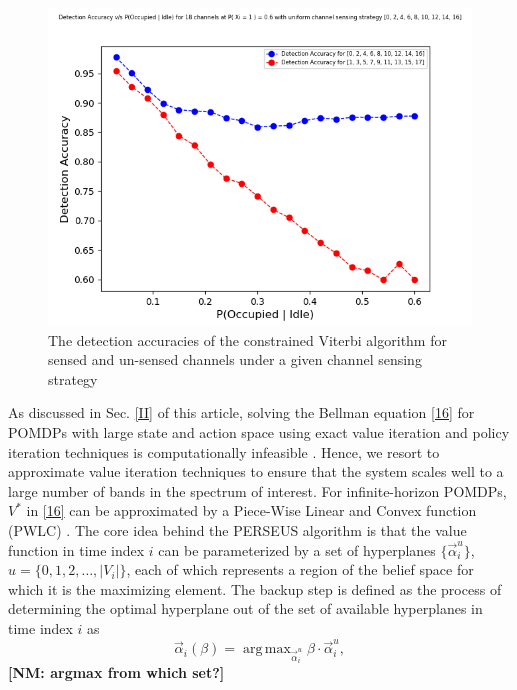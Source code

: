 \documentclass[10pt,twocolumn]{IEEEtran}
\newcommand{\nm}[1]{{\color{blue}\bf{[NM: #1]}}}
\DeclareMathOperator*{\argmax}{arg\,max}
\begin{document}
\begin{figure}
    \centering
    \includegraphics[scale=0.5]{Uniform_Channel_Sensing_1.png}
    \caption{The detection accuracies of the constrained Viterbi algorithm for sensed and un-sensed channels under a given channel sensing strategy}
    \label{fig:4}
\end{figure}
As discussed in Sec. \ref{II} of this article, solving the Bellman equation \eqref{16} for POMDPs with large state and action space using exact value iteration and policy iteration techniques \cite{Kaelbling:1998:PAP:1643275.1643301} is computationally infeasible \cite{DBLP:journals/corr/abs-1109-2145, Pineau:2003:PVI:1630659.1630806}. Hence, we resort to approximate value iteration techniques to ensure that the system scales well to a large number of bands in the spectrum of interest. For infinite-horizon POMDPs, $V^*$ in \eqref{16} can be approximated by a Piece-Wise Linear and Convex function (PWLC) \cite{Kaelbling:1998:PAP:1643275.1643301}. The core idea behind the PERSEUS algorithm is that the value function in time index $i$ can be parameterized by a set of hyperplanes $\{\vec{\alpha}_i^{u}\}$, $u = \{0,1,2,\dots,|V_i|\}$, each of which represents a region of the belief space for which it is the maximizing element. The backup step is defined as the process of determining the optimal hyperplane out of the set of available hyperplanes in time index $i$ as
\begin{equation}\label{39}
    \vec{\alpha}_{i}(\beta) = \argmax_{\vec{\alpha}_{i}^u} \beta \cdot \vec{\alpha}_{i}^u,
\end{equation}
\nm{argmax from which set?}
\end{document}

